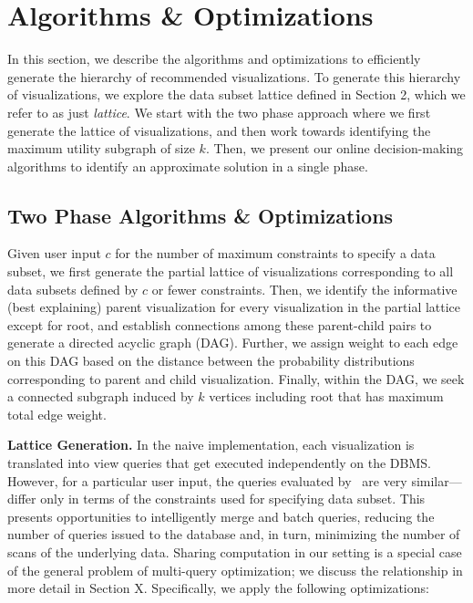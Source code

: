 \section{Algorithms \& Optimizations}
In this section, we describe the algorithms and optimizations to efficiently generate the hierarchy of recommended visualizations. To generate this hierarchy of visualizations, we explore the data subset lattice defined in Section 2, which we refer to as just \emph{lattice}. We start with the two phase approach where we first generate the lattice of visualizations, and then work towards identifying the maximum utility subgraph of size $k$. Then, we present our online decision-making algorithms to identify an approximate solution in a single phase. 


\subsection{Two Phase Algorithms \& Optimizations}
Given user input $c$ for the number of maximum constraints to specify a data subset, we first generate the partial lattice of visualizations corresponding to all data subsets defined by $c$ or fewer constraints. Then, we identify the informative (best explaining) parent visualization for every visualization in the partial lattice except for root, and establish connections among these parent-child pairs to generate a directed acyclic graph (DAG). Further, we assign weight to each edge on this DAG based on the distance between the probability distributions corresponding to parent and child visualization. Finally, within the DAG, we seek a connected subgraph induced by $k$ vertices including root that has maximum total edge weight. 

\textbf{Lattice Generation.} In the naive implementation, each visualization is translated into view queries that get executed independently on the DBMS. However, for a particular user input, the queries evaluated by \system\ are very similar--- differ only in terms of the constraints used for specifying data subset. This presents opportunities to intelligently merge and batch queries, reducing the number of queries issued to the database and, in turn, minimizing the number of scans of the underlying data. Sharing computation in our setting is a special case of the general problem of multi-query optimization; we discuss the relationship in more detail in Section X. Specifically, we apply the following optimizations:

